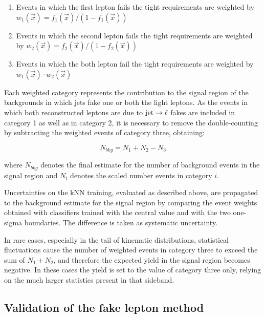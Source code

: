 \begin{enumerate}
\item Events in which the first lepton fails the tight requirements are weighted by $w_1(\vec{x}) = f_1(\vec{x})/(1-f_1(\vec{x}))$
\item Events in which the second lepton fails the tight requirements are weighted by $w_2(\vec{x}) = f_2(\vec{x})/(1-f_2(\vec{x}))$
\item Events in which the both lepton fail the tight requirements are weighted by $w_1(\vec{x}) \cdot w_2(\vec{x})$
\end{enumerate}

Each weighted category represents the contribution to the signal region of the backgrounds in which jets fake one or both the light leptons. As the events 
in which both reconstructed leptons are due to $\mathrm{jet}\rightarrow\ell$ fakes %
are included in category 1 as well as in category 2, it is necessary to remove the double-counting by subtracting the weighted events of category three, obtaining:

\begin{equation}
N_{bkg} = N_1 + N_2 - N_3
\end{equation}

where $N_{bkg}$ denotes the final estimate for the number of background events in the signal region and $N_i$ denotes the scaled number events in category $i$.

Uncertainties on the kNN training, evaluated as described above, are propagated to the background estimate for the signal region by comparing %
the event weights obtained with classifiers trained with the central value and with the two one-sigma boundaries. The difference is taken as systematic uncertainty.

In rare cases, especially in the tail of kinematic distributions, statistical fluctuations cause the number of weighted events in category three to exceed the sum of $N_1 + N_2$, %
and therefore the expected yield in the signal region becomes negative. In these cases the yield is set to the value of category three only, relying on the much larger statistics present in that sideband.


%

\subsection{Validation of the fake lepton method}

